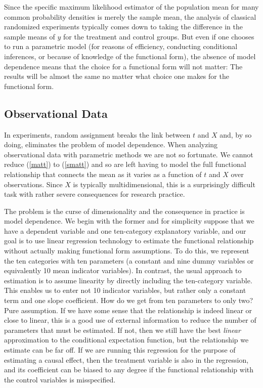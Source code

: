 \documentclass[11pt,titlepage]{article}
\begin{document}
Since the specific maximum likelihood estimator of the population mean
for many common probability densities is merely the sample mean, the
analysis of classical randomized experiments typically comes down to
taking the difference in the sample means of $y$ for the treatment and
control groups.  But even if one chooses to run a parametric model
(for reasons of efficiency, conducting conditional inferences, or
because of knowledge of the functional form), the absence of model
dependence means that the choice for a functional form will not
matter: The results will be almost the same no matter what choice one
makes for the functional form.

\subsection{Observational Data} \label{s:paraobs}

In experiments, random assignment breaks the link between $t$ and $X$
and, by so doing, eliminates the problem of model dependence.  When
analyzing observational data with parametric methods we are not so
fortunate.  We cannot reduce (\ref{matt}) to (\ref{smatt}) and so are
left having to model the full functional relationship that connects
the mean as it varies as a function of $t$ and $X$ over observations.
Since $X$ is typically multidimensional, this is a surprisingly
difficult task with rather severe consequences for research practice.

The problem is the curse of dimensionality and the consequence in
practice is model dependence.  We begin with the former and for
simplicity suppose that we have a dependent variable and one
ten-category explanatory variable, and our goal is to use linear
regression technology to estimate the functional relationship without
actually making functional form assumptions.  To do this, we represent
the ten categories with ten parameters (a constant and nine dummy
variables or equivalently 10 mean indicator variables).  In contrast,
the usual approach to estimation is to assume linearity by directly
including the ten-category variable.  This enables us to enter not 10
indicator variables, but rather only a constant term and one slope
coefficient.  How do we get from ten parameters to only two?  Pure
assumption.  If we have some sense that the relationship is indeed
linear or close to linear, this is a good use of external information
to reduce the number of parameters that must be estimated.  If not,
then we still have the best {\it linear} approximation to the
conditional expectation function, but the relationship we estimate can
be far off.  If we are running this regression for the purpose of
estimating a causal effect, then the treatment variable is also in the
regression, and its coefficient can be biased to any degree if the
functional relationship with the control variables is misspecified.
\end{document}
